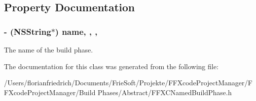 \subsection{Property Documentation}
\hypertarget{interface_f_f_x_c_named_build_phase_a4b93d352d2fca75b34e1b5a50e03f587}{
\subsubsection[{name}]{\setlength{\rightskip}{0pt plus 5cm}-\/ (N\-S\-String$\ast$) name\hspace{0.3cm}{\ttfamily [read]}, {\ttfamily [write]}, {\ttfamily [nonatomic]}, {\ttfamily [strong]}}}\label{interface_f_f_x_c_named_build_phase_a4b93d352d2fca75b34e1b5a50e03f587}
The name of the build phase. 

The documentation for this class was generated from the following file\-:\begin{DoxyCompactItemize}
\item 
/\-Users/florianfriedrich/\-Documents/\-Frie\-Soft/\-Projekte/\-F\-F\-Xcode\-Project\-Manager/\-F\-F\-Xcode\-Project\-Manager/\-Build Phases/\-Abstract/F\-F\-X\-C\-Named\-Build\-Phase.\-h\end{DoxyCompactItemize}
